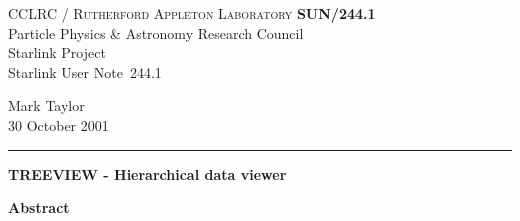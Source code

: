 \documentclass[twoside,11pt]{article}
\newcommand{\stardoccategory}  {Starlink User Note}
\newcommand{\stardocinitials}  {SUN}
\newcommand{\stardocnumber}    {244.1}
\newcommand{\stardocauthors}   {Mark Taylor}
\newcommand{\stardocdate}      {30 October 2001}
\newcommand{\stardoctitle}     {TREEVIEW - Hierarchical data viewer}
\newcommand{\stardocname}{\stardocinitials /\stardocnumber}
\newenvironment{latexonly}{}{}
\renewcommand{\_}{\texttt{\symbol{95}}}
\begin{document}
\thispagestyle{empty}

\begin{latexonly}
   CCLRC / \textsc{Rutherford Appleton Laboratory} \hfill \textbf{\stardocname}\\
   {\large Particle Physics \& Astronomy Research Council}\\
   {\large Starlink Project\\}
   {\large \stardoccategory\ \stardocnumber}
   \begin{flushright}
   \stardocauthors\\
   \stardocdate
   \end{flushright}
   \vspace{-4mm}
   \rule{\textwidth}{0.5mm}
   \vspace{5mm}
   \begin{center}
      {\LARGE\textbf{\stardoctitle \\ [2.5ex]}}
   \end{center}
   \vspace{5mm}


   \begin{center}
      {\Large\textbf{Abstract}}
   \end{center}
\end{latexonly}
\end{document}
